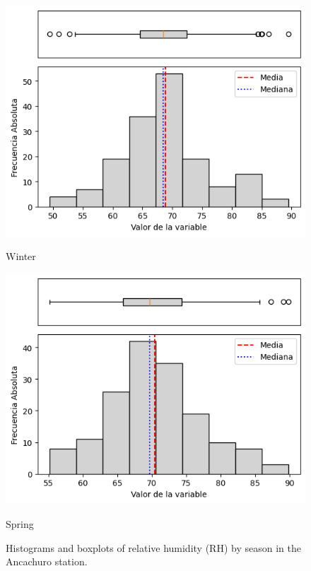 \begin{figure}[H]
\begin{minipage}{0.30\textwidth}
  \includegraphics[width=\linewidth]{resultados/por_estacion_del_anio/boxplot_clases_por_estacion/Ancachuro/RH_HistBoxplot_Winter.png}
  \caption*{Winter}
\end{minipage}
\hfill
\begin{minipage}{0.30\textwidth}
  \includegraphics[width=\linewidth]{resultados/por_estacion_del_anio/boxplot_clases_por_estacion/Ancachuro/RH_HistBoxplot_Spring.png}
  \caption*{Spring}
\end{minipage}
\caption{Histograms and boxplots of relative humidity (RH) by season in the Ancachuro station.}
\label{fig:ancachuro_rh_hist}
\end{figure}

